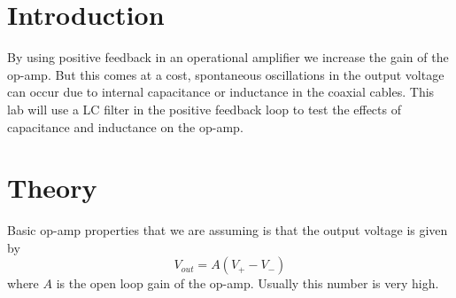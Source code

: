 \documentclass[11pt]{article}
\numberwithin{equation}{section}
\numberwithin{figure}{section}
\numberwithin{table}{section}
\begin{document}


\section{Introduction}
By using positive feedback in an operational amplifier we increase the gain of the op-amp. But this comes at a cost, spontaneous oscillations in the output voltage can occur due to internal capacitance or inductance in the coaxial cables. This lab will use a LC filter in the positive feedback loop to test the effects of capacitance and inductance on the op-amp.

\section{Theory}
Basic op-amp properties that we are assuming is that the output voltage is given by
\begin{equation}
V_{out} = A(V_+-V_-)
\label{VoutVpVm}
\end{equation}
where $A$ is the open loop gain of the op-amp. Usually this number is very high.
\end{document}
